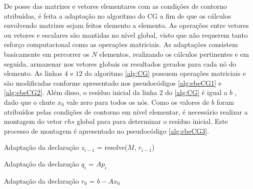 \documentclass[
    12pt,               %
    openright,          %
    oneside,
    a4paper,            %
    english,            %
    french,             %
    spanish,            %
    brazil              %
    ]{abntex2}
\begin{document}
De posse das matrizes e vetores elementares com as condições de contorno atribuídas, é feita a adaptação no algoritmo do  CG a fim de que os cálculos envolvendo matrizes sejam feitos elemento a elemento. As operações entre vetores ou vetores e escalares são mantidas no nível global, visto que não requerem tanto esforço computacional como as operações matriciais.  As adaptações consistem basicamente em percorrer os $N$ elementos, realizando os cálculos pertinentes e em seguida, armazenar nos vetores globais os resultados gerados para cada nó do elemento. As linhas $4$ e $12$ do algoritmo \ref{alg:CG} possuem operações matriciais e são modificadas conforme apresentado nos pseudocódigos \ref{alg:ebeCG1} e \ref{alg:ebeCG2}. Além disso, o resíduo inicial da linha $2$ do \ref{alg:CG} é igual a $b$ , dado que o chute $x_0$ vale zero para todos os nós. Como os valores de $b$ foram atribuídos pelas condições de contorno em nível elementar, é necessário realizar a montagem do vetor $rhs$ global para para determinar o resíduo inicial. Este processo de montagem é apresentado no pseudocódigo \ref{alg:ebeCG3}.

\begin{algorithm}	
	\caption{\label{alg:ebeCG1}Adaptação da declaração $z_{i-1}$ = resolve($M$, $r_{i-1}$)} 
	\begin{algorithmic}[1]
		\EndFor
	\end{algorithmic}
\end{algorithm}

\begin{algorithm}	
	\caption{\label{alg:ebeCG2}Adaptação da declaração $q_i$ = $Ap_i$} 
	\begin{algorithmic}[1]
		\EndFor
	\end{algorithmic}
\end{algorithm}

\begin{algorithm}	
	\caption{\label{alg:ebeCG3}Adaptação da declaração $r_{0}$ = $b - Ax_{0}$} 
	\begin{algorithmic}[1]
		\EndFor
	\end{algorithmic}
\end{algorithm}
\end{document}

